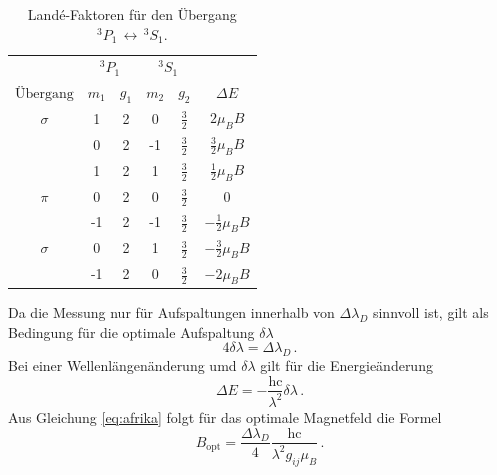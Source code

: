 \begin{table}[h]
        \centering
        \caption{Landé-Faktoren für den Übergang $^{3}P_1 \, \leftrightarrow \, ^{3}S_1$.}
        \label{tab:atab01}
        \begin{tabular}{c c c c c c}
            \toprule
            & \multicolumn{2}{c}{$^{3}P_1 $} & \multicolumn{2}{c}{$^{3}S_1$} \\ %
            \cmidrule(lr){2-3}\cmidrule(lr){4-5}
            {$\text{Übergang}$} & {$m_1$} & {$g_1$} & {$m_2$} & {$g_2$} & {$\Delta E$} \\
            \midrule
            {$\sigma$} & 1 & 2 & 0  & {$\frac{3}{2}$}  & {$2  \mu_B B$} \\
            {}         & 0 & 2 & -1 & {$\frac{3}{2}$}  & {$\frac{3}{2}  \mu_B B$} \\
            \midrule
            {}         & 1  & 2 & 1  & {$\frac{3}{2}$}  & {$\frac{1}{2}  \mu_B B$} \\
            {$\pi$}    & 0  & 2 & 0  & {$\frac{3}{2}$}  & 0 \\
            {}         & -1 & 2 & -1 & {$\frac{3}{2}$}  & {$-\frac{1}{2}  \mu_B B$} \\
            \midrule
            {$\sigma$} & 0  & 2 & 1  & {$\frac{3}{2}$} & {$-\frac{3}{2}  \mu_B B$} \\
            {}         & -1 & 2 & 0  & {$\frac{3}{2}$} & {$-2 \mu_B B$} \\
            \bottomrule
        \end{tabular}
\end{table}
\FloatBarrier
\noindent
Da die Messung nur für Aufspaltungen innerhalb von $\Delta \lambda_D$ sinnvoll ist, gilt als Bedingung für die optimale 
Aufspaltung $\delta \lambda$
\begin{equation*}
    4 \delta \lambda = \Delta \lambda_D \, .
\end{equation*}
Bei einer Wellenlängenänderung umd $\delta \lambda$ gilt für die Energieänderung
\begin{equation*}
    \Delta E = - \frac{\text{hc}}{\lambda^2} \delta \lambda \, .
\end{equation*}
Aus Gleichung \eqref{eq:afrika} folgt für das optimale Magnetfeld die Formel
\begin{equation*}
    B_{\text{opt}} = \frac{\Delta \lambda_D}{4} \frac{\text{hc}}{\lambda^2 g_{ij} \mu_B} \, .
\end{equation*}
